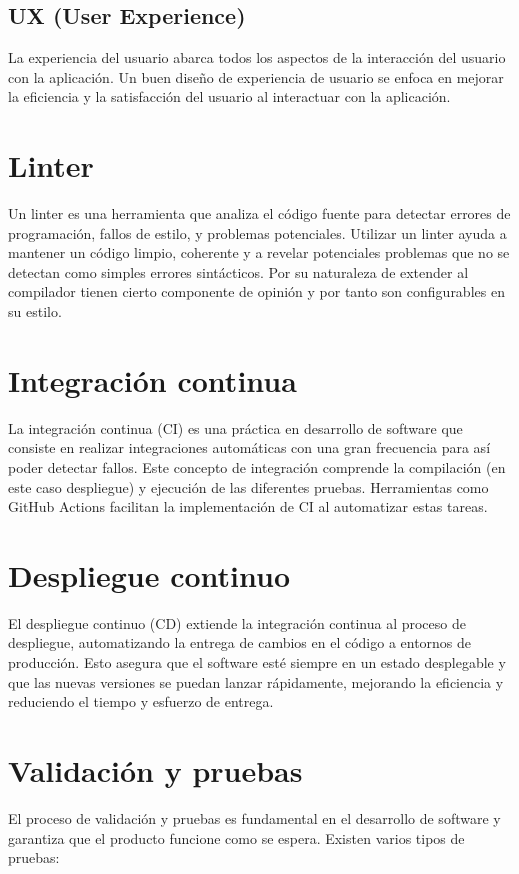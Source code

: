 \subsection{UX (User Experience)}
La experiencia del usuario abarca todos los aspectos de la interacción del usuario con la aplicación. Un buen diseño de experiencia de usuario se enfoca en mejorar la eficiencia y la satisfacción del usuario al interactuar con la aplicación.


\section{Linter}
Un linter \cite{linter} es una herramienta que analiza el código fuente para detectar errores de programación, fallos de estilo, y problemas potenciales. Utilizar un linter ayuda a mantener un código limpio, coherente y a revelar potenciales problemas que no se detectan como simples errores sintácticos. Por su naturaleza de extender al compilador tienen cierto componente de opinión y por tanto son configurables en su estilo.

\section{Integración continua}
La integración continua (CI) \cite{continuous-integration} es una práctica en desarrollo de software que consiste en realizar integraciones automáticas con una gran frecuencia para así poder detectar fallos. Este concepto de integración comprende la compilación (en este caso despliegue) y ejecución de las diferentes pruebas. Herramientas como GitHub Actions facilitan la implementación de CI al automatizar estas tareas.

\section{Despliegue continuo}
El despliegue continuo (CD) \cite{continuous-deployment} extiende la integración continua al proceso de despliegue, automatizando la entrega de cambios en el código a entornos de producción. Esto asegura que el software esté siempre en un estado desplegable y que las nuevas versiones se puedan lanzar rápidamente, mejorando la eficiencia y reduciendo el tiempo y esfuerzo de entrega.


\section{Validación y pruebas}
El proceso de validación y pruebas es fundamental en el desarrollo de software y garantiza que el producto funcione como se espera. Existen varios tipos de pruebas:

